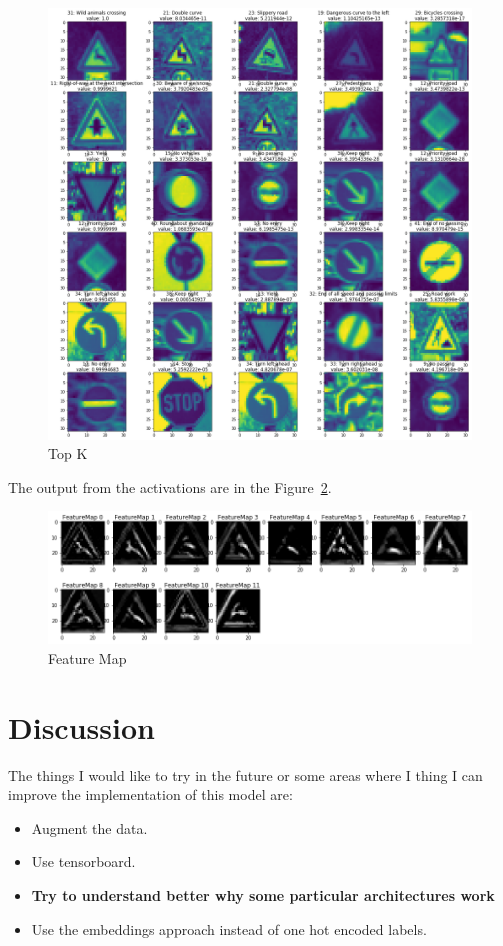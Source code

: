 \documentclass[11pt, a4paper]{article}
\begin{document}
\begin{figure}[htpb!]
	\centering
	\includegraphics[width=0.8\linewidth]{top_k}
	\caption{Top K}
	\label{fig:top_k}
\end{figure}






The output from the activations are in the Figure~\ref{fig:feature_map}. 


\begin{figure}[htpb!]
	\centering
	\includegraphics[width=0.8\linewidth]{feature_map}
	\caption{Feature Map}
	\label{fig:feature_map}
\end{figure}




\section{Discussion}%
\label{sec:discussion}


The things I would like to try in the future or some areas where I thing I can improve the implementation of this model are:


\begin{itemize}
	\item Augment the data. 
	\item Use tensorboard.
	\item \textbf{Try to understand better why some particular architectures work}
	\item Use the embeddings approach instead of one hot encoded labels. 
\end{itemize}
\end{document}
